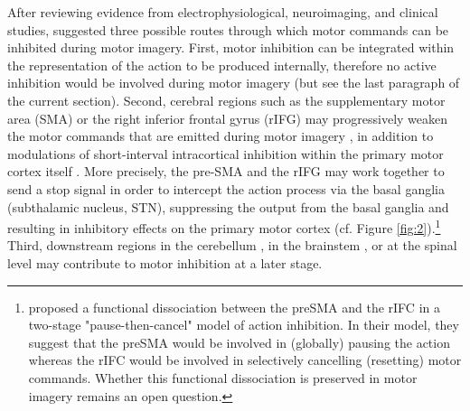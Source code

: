 \documentclass[utf8]{template/frontiersSCNS} %
\begin{document}
After reviewing evidence from electrophysiological, neuroimaging, and clinical studies, \cite{guillot_imagining_2012} suggested three possible routes through which motor commands can be inhibited during motor imagery. First, motor inhibition can be integrated within the representation of the action to be produced internally, therefore no active inhibition would be involved during motor imagery (but see the last paragraph of the current section). Second, cerebral regions such as the supplementary motor area (SMA) \citep{kasess_suppressive_2008} or the right inferior frontal gyrus (rIFG) may progressively weaken the motor commands that are emitted during motor imagery \citep[e.g.,][]{angelini_motor_2015, angelini_proactive_2016}, in addition to modulations of short-interval intracortical inhibition within the primary motor cortex itself \citep{neige_unravelling_2020}. More precisely, the pre-SMA and the rIFG may work together to send a stop signal in order to intercept the action process via the basal ganglia (subthalamic nucleus, STN), suppressing the output from the basal ganglia and resulting in inhibitory effects on the primary motor cortex \citep{aron_reactive_2011} (cf. Figure \ref{fig:2}).\footnote{\cite{diesburg_pause-then-cancel_2021} proposed a functional dissociation between the preSMA and the rIFC in a two-stage "pause-then-cancel" model of action inhibition. In their model, they suggest that the preSMA would be involved in (globally) pausing the action whereas the rIFC would be involved in selectively cancelling (resetting) motor commands. Whether this functional dissociation is preserved in motor imagery remains an open question.} Third, downstream regions in the cerebellum \citep[e.g.,][]{lotze_activation_1999}, in the brainstem \citep[e.g.,][]{jeannerod_neural_2001, jeannerod_motor_2006}, or at the spinal level may contribute to motor inhibition at a later stage.
\end{document}
